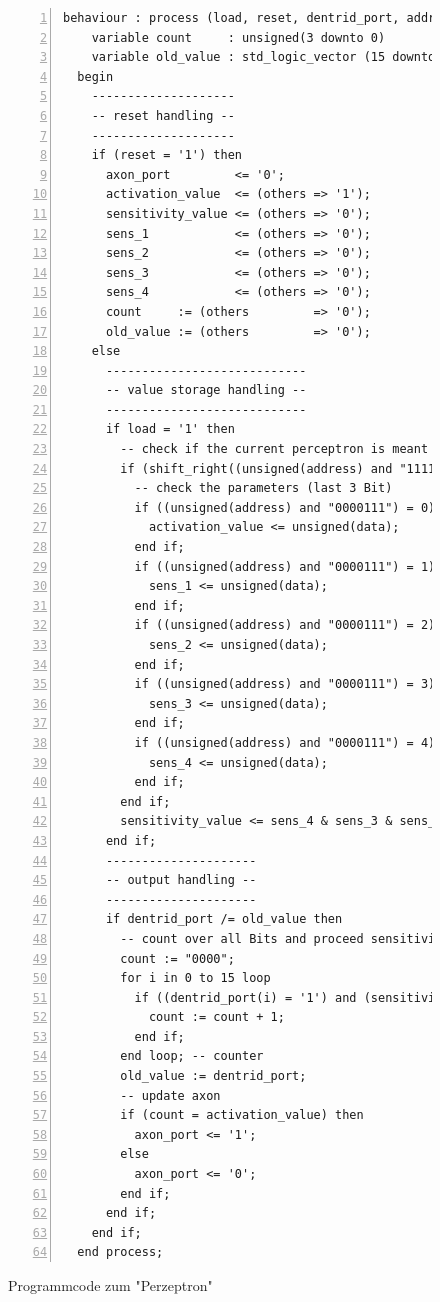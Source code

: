 \documentclass{article}
\numberwithin{equation}{section}
\begin{document}
\begin{figure}[htbp]
\begin{lstlisting}[style=VHDL,numbers=left,stepnumber=1,style=myCustomMatlabStyle,basicstyle=\footnotesize]
behaviour : process (load, reset, dentrid_port, address, data) is
    variable count     : unsigned(3 downto 0)           := (others => '0');
    variable old_value : std_logic_vector (15 downto 0) := (others => '0');
  begin
    --------------------
    -- reset handling --
    --------------------
    if (reset = '1') then
      axon_port         <= '0';
      activation_value  <= (others => '1');
      sensitivity_value <= (others => '0');
      sens_1            <= (others => '0');
      sens_2            <= (others => '0');
      sens_3            <= (others => '0');
      sens_4            <= (others => '0');
      count     := (others         => '0');
      old_value := (others         => '0');
    else
      ----------------------------
      -- value storage handling --
      ----------------------------
      if load = '1' then
        -- check if the current perceptron is meant (first 4 Bit)
        if (shift_right((unsigned(address) and "1111000"), 3) = perceptron_id) then
          -- check the parameters (last 3 Bit)
          if ((unsigned(address) and "0000111") = 0) then
            activation_value <= unsigned(data);
          end if;
          if ((unsigned(address) and "0000111") = 1) then
            sens_1 <= unsigned(data);
          end if;
          if ((unsigned(address) and "0000111") = 2) then
            sens_2 <= unsigned(data);
          end if;
          if ((unsigned(address) and "0000111") = 3) then
            sens_3 <= unsigned(data);
          end if;
          if ((unsigned(address) and "0000111") = 4) then
            sens_4 <= unsigned(data);
          end if;
        end if;
        sensitivity_value <= sens_4 & sens_3 & sens_2 & sens_1;
      end if;
      ---------------------
      -- output handling --
      ---------------------
      if dentrid_port /= old_value then
        -- count over all Bits and proceed sensitivity and and output activation
        count := "0000";
        for i in 0 to 15 loop
          if ((dentrid_port(i) = '1') and (sensitivity_value(i) = '1')) then
            count := count + 1;
          end if;
        end loop; -- counter
        old_value := dentrid_port;
        -- update axon
        if (count = activation_value) then
          axon_port <= '1';
        else
          axon_port <= '0';
        end if;
      end if;
    end if;
  end process;
\end{lstlisting}
\caption{Programmcode zum "Perzeptron"} \label{code:perceptron}
\end{figure}
\end{document}
